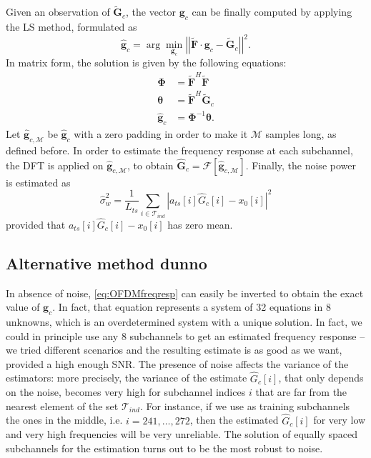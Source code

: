 \documentclass[10pt]{article}
\newcommand{\ofdM} {\mathcal{M}}
\newcommand{\DFTreduced} {\mathbf{\tilde{F}}}
\begin{document}
Given an observation of $\tilde{\mathbf{G}}_c $, the vector $\mathbf{g}_{c}$ can be finally computed by applying the LS method, formulated as
\begin{equation}
	\mathbf{\hat{g}}_c = \arg\min_{\mathbf{g}_c} \left|\left|\DFTreduced \cdot \mathbf{g}_{c} - \tilde{\mathbf{G}}_c\right|\right|^2.
	\label{eq:OFDM_LS}
\end{equation}
In matrix form, the solution is given by the following equations:
\begin{align}
	\boldsymbol{\Phi} &= \DFTreduced^H \DFTreduced \\
	\boldsymbol{\theta} &= \DFTreduced^H \tilde{\mathbf{G}}_c \\ 
	\hat{\mathbf{g}}_{c} &= \boldsymbol{\Phi}^{-1} \boldsymbol{\theta}.
\end{align}
Let $\hat{\mathbf{g}}_{c, \ofdM}$ be $\hat{\mathbf{g}}_{c}$ with a zero padding in order to make it $\ofdM$ samples long, as defined before. In order to estimate the frequency response at each subchannel, the DFT is applied on $\hat{\mathbf{g}}_{c, \ofdM}$, to obtain $\mathbf{\hat{G}}_c = \mathcal{F}[\mathbf{\hat{g}}_{c, \ofdM}]$. 
Finally, the noise power is estimated as 
\begin{equation}
	\hat{\sigma}_w^2 = \frac{1}{L_{ts}} \sum_{i \in \mathcal{T}_{ind}} \left| a_{ts}[i]\hat{G}_c[i] - x_0[i] \right| ^2
\end{equation}
provided that $a_{ts}[i]\hat{G}_c[i] - x_0[i]$ has zero mean.


\subsection*{Alternative method dunno}

In absence of noise, \eqref{eq:OFDMfreqresp} can easily be inverted to obtain the exact value of $\mathbf{g}_c$. In fact, that equation represents a system of 32 equations in 8 unknowns, which is an overdetermined system with a unique solution. In fact, we could in principle use any 8 subchannels to get an estimated frequency response -- we tried different scenarios and the resulting estimate is as good as we want, provided a high enough SNR. The presence of noise affects the variance of the estimators: more precisely, the variance of the estimate $\hat{G}_c[i]$, that only depends on the noise, becomes very high for subchannel indices $i$ that are far from the nearest element of the set $\mathcal{T}_{ind}$. For instance, if we use as training subchannels the ones in the middle, i.e. $i = 241,\ldots,272$, then the estimated $\hat{G}_c[i]$ for very low and very high frequencies will be very unreliable. The solution of equally spaced subchannels for the estimation turns out to be the most robust to noise.
\end{document}

